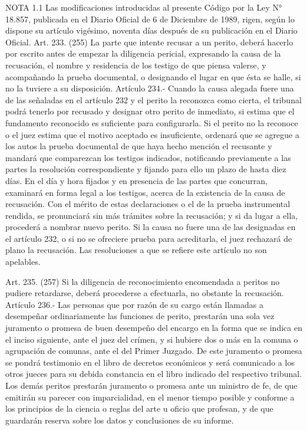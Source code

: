 NOTA 1.1
    Las modificaciones introducidas al presente Código por la Ley N° 18.857, publicada en el Diario Oficial de 6 de Diciembre de 1989, rigen, según lo dispone su artículo vigésimo, noventa días después de su publicación en el Diario Oficial.
    Art. 233. (255) La parte que intente recusar a un perito, deberá hacerlo por escrito antes de empezar la diligencia pericial, expresando la causa de la recusación, el nombre y residencia de los testigo de que piensa valerse, y acompañando la prueba documental, o designando el lugar en que ésta se halle, si no la tuviere a su disposición.
    Artículo 234.- Cuando la causa alegada fuere una de las señaladas en el artículo 232 y el perito la reconozca como cierta, el tribunal podrá tenerlo por recusado y designar otro perito de inmediato, si estima que el fundamento reconocido es suficiente para configurarla.
    Si el perito no la reconoce o el juez estima que el motivo aceptado es insuficiente, ordenará que se agregue a los autos la prueba documental de que haya hecho mención el recusante y mandará que comparezcan los testigos indicados, notificando previamente a las partes la resolución correspondiente y fijando para ello un plazo de hasta diez días.
    En el día y hora fijados y en presencia de las partes que concurran, examinará en forma legal a los testigos, acerca de la existencia de la causa de recusación. Con el mérito  de estas declaraciones o el de la prueba instrumental rendida, se pronunciará sin más trámites sobre la recusación; y si da lugar a ella, procederá a nombrar nuevo perito.
    Si la causa no fuere una de las designadas en el artículo 232, o si no se ofreciere prueba para acreditarla, el juez rechazará de plano la recusación.  Las resoluciones a que se refiere este artículo no son apelables.

    Art. 235. (257) Si la diligencia de reconocimiento encomendada a peritos no pudiere retardarse, deberá procederse a efectuarla, no obstante la recusación.
    Artículo 236.- Las personas que por razón de su cargo están llamadas a desempeñar ordinariamente las funciones de perito, prestarán una sola vez juramento o promesa de buen desempeño del encargo en la forma que se indica en el inciso siguiente, ante el juez del crímen, y si hubiere dos o más en la comuna o agrupación de comunas, ante el del Primer Juzgado.  De este juramento o promesa se pondrá testimonio en el libro de decretos económicos y será comunicado a los otros jueces para su debida constancia en el libro indicado del respectivo tribunal.
    Los demás peritos prestarán juramento o promesa ante un ministro de fe, de que emitirán su parecer con imparcialidad, en el menor tiempo posible y conforme a los principios de la ciencia o reglas del arte u oficio que profesan, y de que guardarán reserva sobre los datos y conclusiones de su informe.

